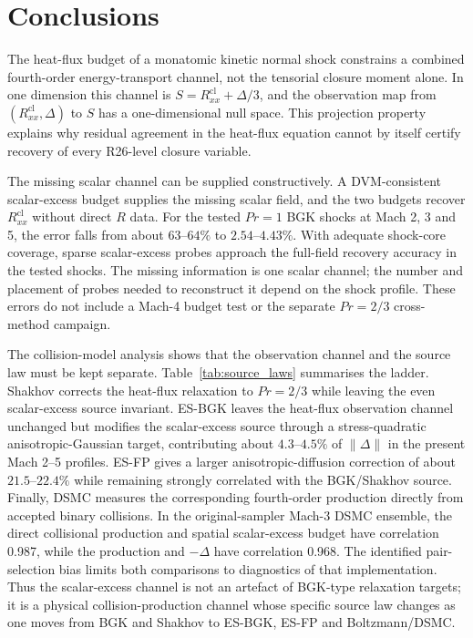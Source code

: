 \documentclass[lineno,paper]{JFM-FLM_Au}
\newenvironment{revision}{\nolinenumbers\begin{tcolorbox}[breakable,colback=revisionyellow,colframe=revisionyellow,boxrule=0pt,arc=0pt,left=5pt,right=5pt,top=5pt,bottom=5pt,before skip=6pt,after skip=6pt]\captionsetup{width=\linewidth}}{\end{tcolorbox}\linenumbers}
\newenvironment{revision}{}{}
\newcommand{\cl}{\mathrm{cl}}
\begin{document}
\section{Conclusions}
\label{sec:conclusion}

The heat-flux budget of a monatomic kinetic normal shock constrains a combined fourth-order energy-transport channel, not the tensorial closure moment alone.  In one dimension this channel is $S=R^{\cl}_{xx}+\Delta/3$, and the observation map from $(R^{\cl}_{xx},\Delta)$ to $S$ has a one-dimensional null space.  This projection property explains why residual agreement in the heat-flux equation cannot by itself certify recovery of every R26-level closure variable.

\begin{revision}
The missing scalar channel can be supplied constructively.  A DVM-consistent scalar-excess budget supplies the missing scalar field, and the two budgets recover $R^{\cl}_{xx}$ without direct $R$ data.  For the tested $Pr=1$ BGK shocks at Mach 2, 3 and 5, the error falls from about $63$--$64\%$ to $2.54$--$4.43\%$.  With adequate shock-core coverage, sparse scalar-excess probes approach the full-field recovery accuracy in the tested shocks. The missing information is one scalar channel; the number and placement of probes needed to reconstruct it depend on the shock profile. These errors do not include a Mach-4 budget test or the separate $Pr=2/3$ cross-method campaign.
\end{revision}

\begin{revision}
The collision-model analysis shows that the observation channel and the source law must be kept separate.  Table~\ref{tab:source_laws} summarises the ladder.  Shakhov corrects the heat-flux relaxation to $Pr=2/3$ while leaving the even scalar-excess source invariant.  ES-BGK leaves the heat-flux observation channel unchanged but modifies the scalar-excess source through a stress-quadratic anisotropic-Gaussian target, contributing about $4.3$--$4.5\%$ of $\|\Delta\|$ in the present Mach 2--5 profiles.  ES-FP gives a larger anisotropic-diffusion correction of about $21.5$--$22.4\%$ while remaining strongly correlated with the BGK/Shakhov source.  Finally, DSMC measures the corresponding fourth-order production directly from accepted binary collisions.  In the original-sampler Mach-3 DSMC ensemble, the direct collisional production and spatial scalar-excess budget have correlation 0.987, while the production and $-\Delta$ have correlation 0.968. The identified pair-selection bias limits both comparisons to diagnostics of that implementation.  Thus the scalar-excess channel is not an artefact of BGK-type relaxation targets; it is a physical collision-production channel whose specific source law changes as one moves from BGK and Shakhov to ES-BGK, ES-FP and Boltzmann/DSMC.
\end{revision}
\end{document}

